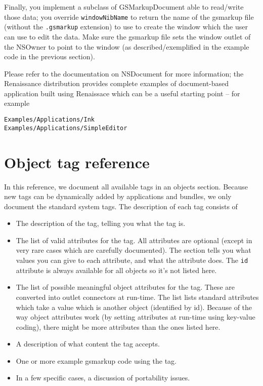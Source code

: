Finally, you implement a subclass of GSMarkupDocument able to
read/write those data; you override \texttt{windowNibName} to return
the name of the gsmarkup file (without the \texttt{.gsmarkup}
extension) to use to create the window which the user can use to edit
the data.  Make sure the gsmarkup file sets the window outlet of the
NSOwner to point to the window (as described/exemplified in the
example code in the previous section).

Please refer to the documentation on NSDocument for more information;
the Renaissance distribution provides complete examples of
document-based application built using Renaissace which can be a
useful starting point -- for example
\begin{verbatim}
Examples/Applications/Ink
Examples/Applications/SimpleEditor
\end{verbatim}



\section{Object tag reference}

In this reference, we document all available tags in an objects
section.  Because new tags can be dynamically added by applications
and bundles, we only document the standard system tags.  The
description of each tag consists of
\begin{itemize}
\item The description of the tag, telling you what the tag is.
\item The list of valid attributes for the tag.  All attributes are
  optional (except in very rare cases which are carefully documented).
  The section tells you what values you can give to each attribute,
  and what the attribute does.  The \texttt{id} attribute is always
  available for all objects so it's not listed here.
\item The list of possible meaningful object attributes for the tag.
  These are converted into outlet connectors at run-time.  The list
  lists standard attributes which take a value which is another object
  (identified by id).  Because of the way object attributes work (by
  setting attributes at run-time using key-value coding), there might
  be more attributes than the ones listed here.
\item A description of what content the tag accepts.
\item One or more example gsmarkup code using the tag.
\item In a few specific cases, a discussion of portability issues.
\end{itemize}

